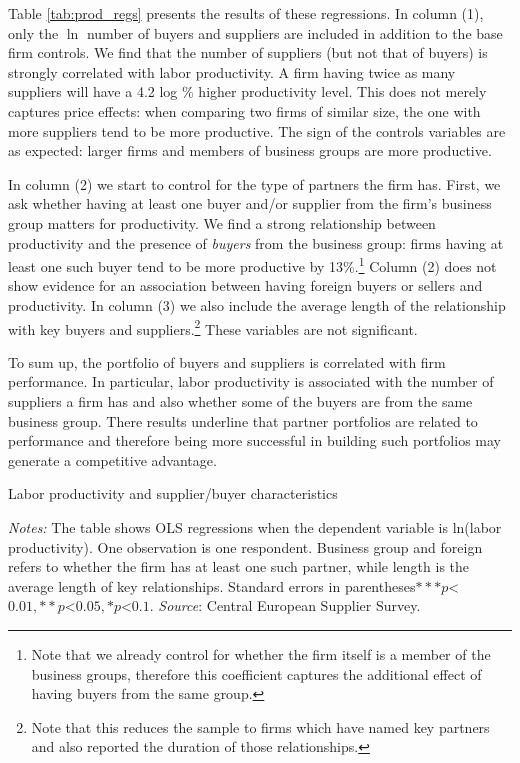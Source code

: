 \documentclass[final, dvipsnames, authoryear,12pt]{elsarticle}
\begin{document}

Table \ref{tab:prod_regs} presents the results of these regressions. In column (1), only the $\ln$ number of buyers and suppliers are included in addition to the base firm controls. We find that the number of suppliers (but not that of buyers) is strongly correlated with labor productivity. A firm having twice as many suppliers will have a 4.2 log \% higher productivity level. This does not merely captures price effects: when comparing two firms of similar size, the one with more suppliers tend to be more productive. The sign of the controls variables are as expected: larger firms and members of business groups are more productive.

In column (2) we start to control for the type of partners the firm has. First, we ask whether having at least one buyer and/or supplier from the firm's business group matters for productivity. We find a strong relationship between productivity and the presence of \textit{buyers} from the business group: firms having at least one such buyer tend to be more productive by 13\%.\footnote{Note that we already control for whether the firm itself is a member of the business groups, therefore this coefficient captures the additional effect of having buyers from the same group.} Column (2) does not show evidence for an association between having foreign buyers or sellers and productivity. In column (3) we also include the average length of the relationship with key buyers and suppliers.\footnote{Note that this reduces the sample to firms which have named key partners and also reported the duration of those relationships.} These variables are not significant.

To sum up, the portfolio of buyers and suppliers is correlated with firm performance. In particular, labor productivity is associated with the number of suppliers a firm has and also whether some of the buyers are from the same business group. There results underline that partner portfolios are related to performance and therefore being more successful in building such portfolios may generate a competitive advantage.


\begin{table}[H]
    \caption{Labor productivity and supplier/buyer characteristics}
    \label{tab:prod_regs}
    \centerline{}

    {\scriptsize \textit{Notes:} The table shows OLS regressions when the dependent variable is ln(labor productivity). One observation is one respondent. Business group and foreign refers to whether the firm has at least one such partner, while length is the average length of key relationships. Standard errors in parentheses$ *** p$<$0.01, ** p$<$0.05, * p$<$0.1 $. \textit{Source}: Central European Supplier Survey.}
\end{table}
    
\end{document}
